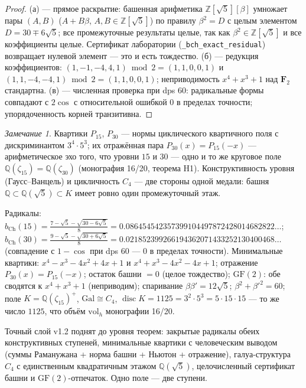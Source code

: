 \documentclass[11pt,a4paper]{article}
\theoremstyle{plain}
\theoremstyle{definition}
\theoremstyle{remark}
\newtheorem{remark}[theorem]{Замечание}
\newcommand{\ZZ}{\mathbb{Z}}
\newcommand{\QQ}{\mathbb{Q}}
\newcommand{\disc}{\operatorname{disc}}
\begin{document}
\begin{proof}
(а) --- прямое раскрытие: башенная арифметика
$\ZZ[\sqrt5][\beta]$ умножает пары $(A,B)$
($A+B\beta$, $A,B\in\ZZ[\sqrt5]$) по правилу
$\beta^2=D$ с целым элементом $D=30\mp6\sqrt5$; все
промежуточные результаты целые, так как $\beta^2\in\ZZ[\sqrt5]$
и все коэффициенты целые. Сертификат лаборатории
(\texttt{\_bch\_exact\_residual}) возвращает нулевой элемент ---
это и есть тождество. (б) — редукция коэффициентов:
$(1,-1,-4,4,1)\bmod2=(1,1,0,0,1)$ и
$(1,1,-4,-4,1)\bmod2=(1,1,0,0,1)$; неприводимость
$x^4+x^3+1$ над $\mathbf{F}_2$ стандартна. (в) —
численная проверка при dps 60: радикальные формы совпадают с
$2\cos$ с относительной ошибкой $0$ в пределах точности;
упорядоченность корней транзитивна.
\end{proof}

\begin{remark}
Квартики $P_{15}$, $P_{30}$ --- нормы циклического квартичного
поля с дискриминантом $3^4\cdot5^3$; их отражённая пара
$P_{30}(x)=P_{15}(-x)$ --- арифметическое эхо того, что уровни
$15$ и $30$ --- одно и то же круговое поле $\QQ(\zeta_{15})
=\QQ(\zeta_{30})$ (монография 16/20, теорема H1). Конструктивность
уровня (Гаусс--Ванцель) и цикличность $C_4$ --- две стороны
одной медали: башня $\QQ\subset\QQ(\sqrt5)\subset K$ имеет ровно
один промежуточный этаж.
\end{remark}

\begin{databox}
Радикалы: $b_{\mathrm{Ch}}(15)=\frac{7-\sqrt5-\sqrt{30-6\sqrt5}}{8}
=0.086454542357399104497872428014682822\ldots$;
$b_{\mathrm{Ch}}(30)=\frac{9-\sqrt5-\sqrt{30+6\sqrt5}}{8}
=0.021852399266194362071433252130400468\ldots$
(совпадение с $1-\cos$ при dps 60 --- $0$ в пределах точности).
Минимальные квартики: $x^4-x^3-4x^2+4x+1$ и
$x^4+x^3-4x^2-4x+1$; отражение $P_{30}(x)=P_{15}(-x)$;
остаток башни $=0$ (целое тождество); $\mathrm{GF}(2)$:
обе сводятся к $x^4+x^3+1$ (неприводим); спаривание
$\beta\beta'=12\sqrt5$; $\beta^2+\beta'^2=60$; поле
$K=\QQ(\zeta_{15})^+$, $\mathrm{Gal}\cong C_4$,
$\disc K=1125=3^2\cdot5^3=5\cdot15\cdot15$ --- то же число
$1125$, что объём $\mathrm{vol}_h$ монографии 16/20.
\end{databox}

\begin{statusbox}[итог]
Точный слой v1.2 поднят до уровня теорем: закрытые радикалы обеих
конструктивных ступеней, минимальные квартики с человеческим
выводом (суммы Раманужана + норма башни + Ньютон + отражение),
галуа-структура $C_4$ с единственным квадратичным этажом
$\QQ(\sqrt5)$, целочисленный сертификат башни и $\mathrm{GF}(2)$-отпечаток.
Одно поле --- две ступени.
\end{statusbox}
\end{document}

